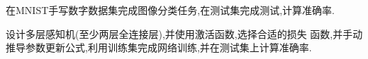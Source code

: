在MNIST手写数字数据集完成图像分类任务,在测试集完成测试,计算准确率.

设计多层感知机(至少两层全连接层),并使用激活函数,选择合适的损失 函数,并手动推导参数更新公式,利用训练集完成网络训练,并在测试集上计算准确率.